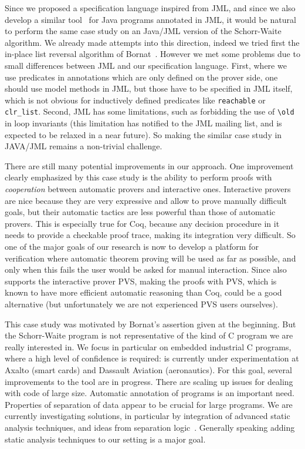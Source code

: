 Since we proposed a specification language inspired from JML, and
since we also develop a similar
tool~\cite{marche04jlap,marche05tphols} for Java programs annotated in
JML, it would be natural to perform the same case study on an Java/JML
version of the Schorr-Waite algorithm. We already made attempts into
this direction, indeed we tried first the in-place list
reversal algorithm of
Bornat~\cite{bornat00mpc,filliatre04icfem}. However we met some 
problems due to small differences between JML and our specification
language. First, where we use predicates in annotations which are only
defined on the prover side, one should use model methods in JML, but
those have to be specified in JML itself, which is not obvious for
inductively defined predicates like \verb|reachable| or \verb|clr_list|.
Second, JML has some limitations, such as forbidding the use of
\verb|\old| in loop invariants (this limitation has notified to the JML 
mailing list, and is expected to be relaxed in a near future). So
making the similar case study in JAVA/JML remains a non-trivial
challenge. 

There are still many potential improvements in our approach. One
improvement clearly emphasized by this case study is the ability to
perform proofs with \emph{cooperation} between automatic provers and
interactive ones. Interactive provers are nice because they are very
expressive and allow to prove manually difficult goals, but their
automatic tactics are less powerful than those of automatic provers. This is
especially true for Coq, because any decision procedure in it needs to
provide a checkable proof trace, making its integration very
difficult. So one of the major goals of our research is now to develop
a platform for verification where automatic theorem proving will be
used as far as possible, and only when this fails the user would be asked
for manual interaction. Since \caduceus{} also supports the interactive
prover PVS, making the proofs with PVS, which is known to have more
efficient automatic reasoning than Coq, could be a good alternative
(but unfortunately we are not experienced PVS users ourselves).

This case study was motivated by Bornat's assertion given at the
beginning. But the Schorr-Waite program is not representative of the
kind of C program we are really interested in. We focus in particular
on embedded industrial C programs, where a high level of confidence is
required: \caduceus{} is currently under experimentation at Axalto
(smart cards) and Dassault Aviation (aeronautics). For this goal,
several improvements to the \caduceus{} tool are in progress. There
are scaling up issues for dealing with code of large size. Automatic
annotation of programs is an important need. Properties of separation
of data appear to be crucial for large programs. We are currently
investigating solutions, in particular by integration of advanced
static analysis techniques, and ideas from separation
logic~\cite{reynolds02lics}. Generally speaking adding static analysis
techniques to our setting is a major goal.

